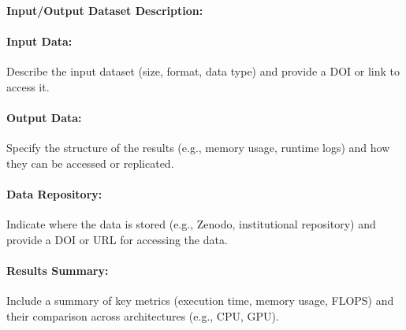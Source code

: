 \paragraph{Input/Output Dataset Description:}
\paragraph{Input Data:} Describe the input dataset (size, format, data type) and provide a DOI or link to access it.

\paragraph{Output Data:} Specify the structure of the results (e.g., memory usage, runtime logs) and how they can be accessed or replicated.

\paragraph{Data Repository:} Indicate where the data is stored (e.g., Zenodo, institutional repository) and provide a DOI or URL for accessing the data.

\paragraph{Results Summary:} Include a summary of key metrics (execution time, memory usage, FLOPS) and their comparison across architectures (e.g., CPU, GPU).

